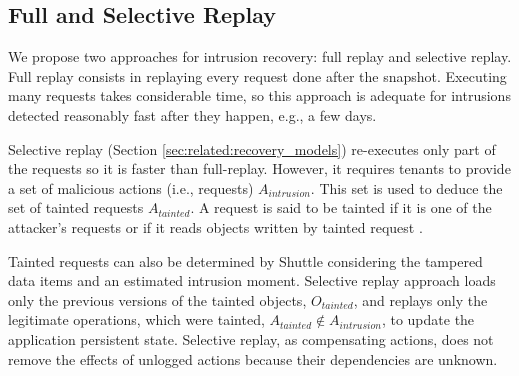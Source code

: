 
\subsection{Full and Selective Replay}
\label{sec:arch:selective_replay}

We propose two approaches for intrusion recovery: full replay and selective replay. Full replay consists in replaying every request done after the  snapshot. Executing many requests takes considerable time, so this approach is adequate for intrusions detected reasonably fast after they happen, e.g., a few days. 


Selective replay (Section \ref{sec:related:recovery_models})  re-executes only part of the requests so it is faster than full-replay. However, it requires tenants to provide a set of malicious actions (i.e., requests) $A_{intrusion}$. This set is used to deduce the set of tainted requests $A_{tainted}$. A request is said to be tainted if it is one of the attacker’s requests or if it reads objects written by tainted request \cite{taser,itdb,phoenix}.  

Tainted requests can also be determined by Shuttle considering the tampered data items and an estimated intrusion moment. Selective replay approach loads only the previous versions of the tainted objects, $O_{tainted}$, and replays only the legitimate operations, which were tainted, $A_{tainted} \notin A_{intrusion}$, to update the application persistent state. Selective replay, as compensating actions, does not remove the effects of unlogged actions because their dependencies are unknown. 

